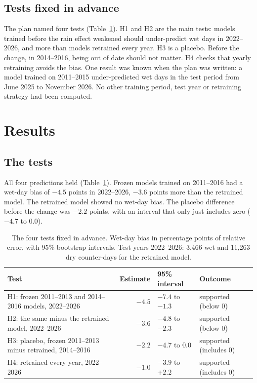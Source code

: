 \documentclass[preprint,12pt,authoryear]{elsarticle}
\begin{document}
\subsection{Tests fixed in advance}

The plan named four tests (Table~\ref{tab:tests}). H1 and H2 are the main tests: models trained before the rain effect weakened should under-predict wet days in 2022--2026, and more than models retrained every year. H3 is a placebo. Before the change, in 2014--2016, being out of date should not matter. H4 checks that yearly retraining avoids the bias. One result was known when the plan was written: a model trained on 2011--2015 under-predicted wet days in the test period from June 2025 to November 2026. No other training period, test year or retraining strategy had been computed.

\section{Results}

\subsection{The tests}

All four predictions held (Table~\ref{tab:tests}). Frozen models trained on 2011--2016 had a wet-day bias of $-4.5$ points in 2022--2026, $-3.6$ points more than the retrained model. The retrained model showed no wet-day bias. The placebo difference before the change was $-2.2$ points, with an interval that only just includes zero ($-4.7$ to $0.0$).

\begin{table}[!htbp]
\centering
\caption{The four tests fixed in advance. Wet-day bias in percentage points of relative error, with 95\% bootstrap intervals. Test years 2022--2026: 3,466 wet and 11,263 dry counter-days for the retrained model.}
\label{tab:tests}
\small
\begin{tabular}{@{}p{5.7cm}rp{2.8cm}p{2.2cm}@{}}
\toprule
Test & Estimate & 95\% interval & Outcome \\
\midrule
H1: frozen 2011--2013 and 2014--2016 models, 2022--2026 & $-4.5$ & $-7.4$ to $-1.3$ & supported (below 0) \\
H2: the same minus the retrained model, 2022--2026 & $-3.6$ & $-4.8$ to $-2.3$ & supported (below 0) \\
H3: placebo, frozen 2011--2013 minus retrained, 2014--2016 & $-2.2$ & $-4.7$ to $0.0$ & supported (includes 0) \\
H4: retrained every year, 2022--2026 & $-1.0$ & $-3.9$ to $+2.2$ & supported (includes 0) \\
\bottomrule
\end{tabular}
\end{table}
\end{document}
